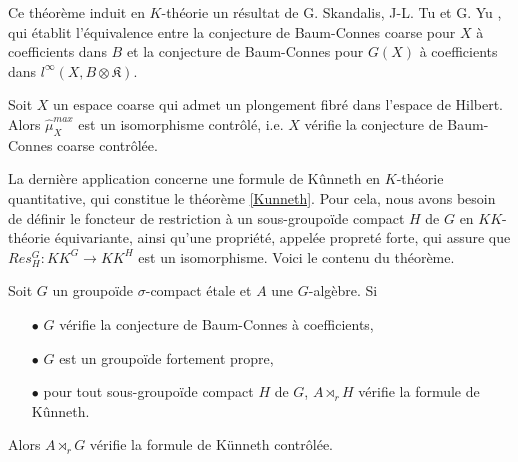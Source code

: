 Ce théorème induit en $K$-théorie un résultat de G. Skandalis, J-L. Tu et G. Yu \cite{SkTuYu}, qui établit l'équivalence entre la conjecture de Baum-Connes coarse pour $X$ à coefficients dans $B$ et la conjecture de Baum-Connes pour $G(X)$ à coefficients dans $l^\infty(X,B\otimes \mathfrak K)$. \\

\begin{cor}
Soit $X$ un espace coarse qui admet un plongement fibré dans l'espace de Hilbert. Alors $\hat \mu_{X}^{max}$ est un isomorphisme contrôlé, i.e. $X$ vérifie la conjecture de Baum-Connes coarse contrôlée.
\end{cor}

La dernière application concerne une formule de Kûnneth en $K$-théorie quantitative, qui constitue le théorème \ref{Kunneth}. Pour cela, nous avons besoin de définir le foncteur de restriction à un sous-groupoïde compact $H$ de $G$ en $KK$-théorie équivariante, ainsi qu'une propriété, appelée propreté forte, qui assure que $Res_H^G : KK^G \rightarrow KK^H$ est un isomorphisme. Voici le contenu du théorème.

\begin{thm}
Soit $G$ un groupoïde $\sigma$-compact étale et $A$ une $G$-algèbre. Si 
\begin{itemize}
\item[$\bullet$] $G$ vérifie la conjecture de Baum-Connes à coefficients,
\item[$\bullet$] $G$ est un groupoïde fortement propre,
\item[$\bullet$] pour tout sous-groupoïde compact $H$ de $G$, $A\rtimes_r H$ vérifie la formule de Kûnneth.
\end{itemize} 
Alors $A\rtimes_r G$ vérifie la formule de Künneth contrôlée.
\end{thm}




































